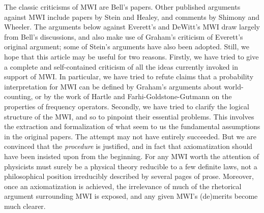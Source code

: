 \documentclass[aps,pra,12pt]{revtex4}
\begin{document}
The classic criticisms of MWI are Bell's papers.\cite{bell1,bell2}
Other published arguments against MWI include papers by
Stein\cite{stein} and Healey,\cite{healey} 
and comments by Shimony\cite{shim} and Wheeler.\cite{wheel}
The arguments below against Everett's and DeWitt's MWI 
draw largely from Bell's discussions, and also make use of 
Graham's criticism\cite{gr} of Everett's original argument;
some of Stein's arguments have also been adopted. 
Still, we hope that this article may be useful for two reasons.  
Firstly, we have tried to give a complete and self-contained criticism of 
all the ideas currently invoked in support of MWI. 
In particular, we have tried to refute claims that a probability 
interpretation for MWI can be defined by Graham's arguments about 
world-counting, or by the work of Hartle and Farhi-Goldstone-Gutmann on
the properties of frequency operators.  
Secondly, we have tried to clarify the logical structure of the MWI,
and so to pinpoint their essential problems. 
This involves the extraction and formalization of what seem to us the
fundamental assumptions in the original papers.  
The attempt may not have entirely succeeded.
But we are convinced that the {\em procedure} is justified, 
and in fact that axiomatization should have been insisted upon 
from the beginning. 
For any MWI worth the attention of physicists must surely be a
physical theory reducible to a few definite laws, not a
philosophical position irreducibly described by several pages of
prose. Moreover, once an axiomatization is achieved,
the irrelevance of much of the rhetorical argument surrounding MWI is exposed, 
and any given MWI's (de)merits become much clearer. 
\end{document}
